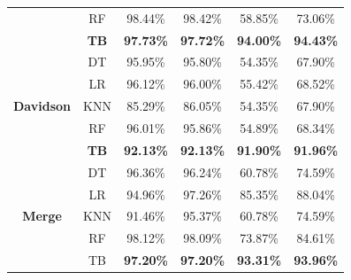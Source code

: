 \documentclass[11pt]{article}
\begin{document}
\begin{table}[]
{\begin{tabular}{|c|c|cc|cc|}
                                     & RF          & \multicolumn{1}{c|}{98.44\%}          & 98.42\%          & \multicolumn{1}{c|}{58.85\%}          & 73.06\%          \\ \cline{2-6} 
                                     & \textbf{TB} & \multicolumn{1}{c|}{\textbf{97.73\%}} & \textbf{97.72\%} & \multicolumn{1}{c|}{\textbf{94.00\%}} & \textbf{94.43\%} \\ \hline
\multirow{5}{*}{\textbf{Davidson}}   & DT          & \multicolumn{1}{c|}{95.95\%}          & 95.80\%          & \multicolumn{1}{c|}{54.35\%}          & 67.90\%          \\ \cline{2-6} 
                                     & LR          & \multicolumn{1}{c|}{96.12\%}          & 96.00\%          & \multicolumn{1}{c|}{55.42\%}          & 68.52\%          \\ \cline{2-6} 
                                     & KNN         & \multicolumn{1}{c|}{85.29\%}          & 86.05\%          & \multicolumn{1}{c|}{54.35\%}          & 67.90\%          \\ \cline{2-6} 
                                     & RF          & \multicolumn{1}{c|}{96.01\%}          & 95.86\%          & \multicolumn{1}{c|}{54.89\%}          & 68.34\%          \\ \cline{2-6} 
                                     & \textbf{TB} & \multicolumn{1}{c|}{\textbf{92.13\%}} & \textbf{92.13\%} & \multicolumn{1}{c|}{\textbf{91.90\%}} & \textbf{91.96\%} \\ \hline
\multirow{5}{*}{\textbf{Merge}}      & DT          & \multicolumn{1}{c|}{96.36\%}          & 96.24\%          & \multicolumn{1}{c|}{60.78\%}          & 74.59\%          \\ \cline{2-6} 
                                     & LR          & \multicolumn{1}{c|}{94.96\%}          & 97.26\%          & \multicolumn{1}{c|}{85.35\%}          & 88.04\%          \\ \cline{2-6} 
                                     & KNN         & \multicolumn{1}{c|}{91.46\%}          & 95.37\%          & \multicolumn{1}{c|}{60.78\%}          & 74.59\%          \\ \cline{2-6} 
                                     & RF          & \multicolumn{1}{c|}{98.12\%}          & 98.09\%          & \multicolumn{1}{c|}{73.87\%}          & 84.61\%          \\ \cline{2-6} 
                                     & TB          & \multicolumn{1}{c|}{\textbf{97.20\%}} & \textbf{97.20\%} & \multicolumn{1}{c|}{\textbf{93.31\%}} & \textbf{93.96\%} \\ \hline
\end{tabular}%
}
\end{table}
\end{document}
